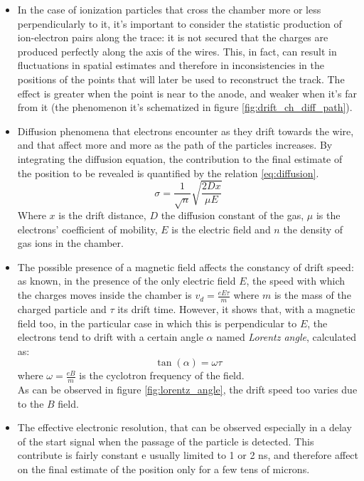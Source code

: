 \documentclass[a4paper,11pt]{book}
\begin{document}
\begin{itemize}
\item In the case of ionization particles that cross the chamber more or less perpendicularly to it, it's important to consider the statistic production of ion-electron pairs along the trace: it is not secured that the charges are produced perfectly along the axis of the wires. This, in fact, can result in fluctuations in spatial estimates and therefore in inconsistencies in the positions of the points that will later be used to reconstruct the track. The effect is greater when the point is near to the anode, and weaker when it's far from it (the phenomenon it's schematized in figure \ref{fig:drift_ch_diff_path}).
\item Diffusion phenomena that electrons encounter as they drift towards the wire, and that affect more and more as the path of the particles increases. By integrating the diffusion equation, the contribution to the final estimate of the position to be revealed is quantified by the relation \ref{eq:diffusion}.
\begin{equation}
\label{eq:diffusion}
\sigma = \frac{1}{\sqrt{n}}\sqrt{\frac{2Dx}{\mu E}}
\end{equation}
Where $x$ is the drift distance, $D$ the diffusion constant of the gas, $\mu$ is the electrons' coefficient of mobility, $E$ is the electric field and $n$ the density of gas ions in the chamber.\\
\item The possible presence of a magnetic field affects the constancy of drift speed: as known, in the presence of the only electric field $E$, the speed with which the charges moves inside the chamber is $v_d = \frac{eE\tau}{m}$ where $m$ is the mass of the charged particle and $\tau$ its drift time. However, it shows that, with a magnetic field too, in the particular case in which this is perpendicular to $E$, the electrons tend to drift with a certain angle $\alpha$ named \textit{Lorentz angle}, calculated as:
\[ \tan(\alpha) = \omega\tau \]
where $\omega = \frac{eB}{m}$ is the cyclotron frequency of the field.\\
As can be observed in figure \ref{fig:lorentz_angle}, the drift speed too varies due to the $B$ field.\\
\item The effective electronic resolution, that can be observed especially in a delay of the start signal when the passage of the particle is detected. This contribute is fairly constant e usually limited to 1 or 2 ns, and therefore affect on the final estimate of the position only for a few tens of microns.
\end{itemize}
\end{document}
